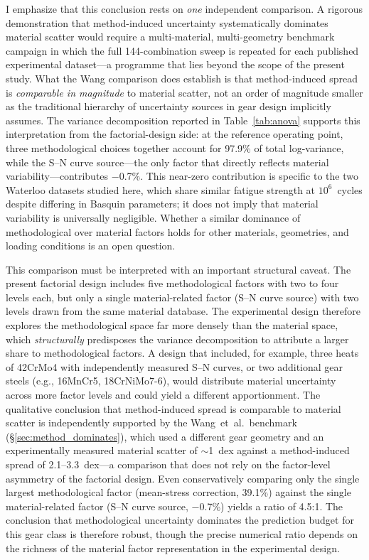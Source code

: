 \documentclass[12pt,a4paper]{article}
\begin{document}
I emphasize that this conclusion rests on \emph{one} independent
comparison. A rigorous demonstration that method-induced uncertainty
systematically dominates material scatter would require a
multi-material, multi-geometry benchmark campaign in which the full
144-combination sweep is repeated for each published experimental
dataset---a programme that lies beyond the scope of the present study.
What the Wang comparison does establish is that method-induced spread
is \emph{comparable in magnitude} to material scatter, not an order of
magnitude smaller as the traditional hierarchy of uncertainty sources
in gear design implicitly assumes. The variance decomposition reported
in Table~\ref{tab:anova} supports this
interpretation from the factorial-design side: at the reference
operating point, three methodological choices together account for
97.9\% of total log-variance, while the S--N curve source---the only
factor that directly reflects material variability---contributes
$-$0.7\%. This near-zero contribution is specific to the two Waterloo
datasets studied here, which share similar fatigue strength at
$10^6$~cycles despite differing in Basquin parameters; it does not
imply that material variability is universally negligible. Whether a
similar dominance of methodological over material factors holds for
other materials, geometries, and loading conditions is an open
question.

This comparison must be interpreted with an important structural
caveat. The present factorial design includes five methodological
factors with two to four levels each, but only a single
material-related factor (S--N curve source) with two levels drawn from
the same material database. The experimental design therefore explores
the methodological space far more densely than the material space,
which \emph{structurally} predisposes the variance decomposition to
attribute a larger share to methodological factors. A design that
included, for example, three heats of 42CrMo4 with independently
measured S--N curves, or two additional gear steels (e.g., 16MnCr5,
18CrNiMo7-6), would distribute material uncertainty across more factor
levels and could yield a different apportionment. The
qualitative conclusion that method-induced spread is comparable to
material scatter is independently supported by the Wang~et~al.\
benchmark (\S\ref{sec:method_dominates}), which used a different gear
geometry and an experimentally measured material scatter of $\sim$1~dex
against a method-induced spread of 2.1--3.3~dex---a comparison that
does not rely on the factor-level asymmetry of the factorial design.
Even conservatively comparing only the single largest methodological
factor (mean-stress correction, 39.1\%) against the single
material-related factor (S--N curve source, $-$0.7\%) yields a ratio of
4.5:1. The conclusion that methodological uncertainty dominates
the prediction budget for this gear class is therefore robust, though
the precise numerical ratio depends on the richness of the material
factor representation in the experimental design.
\end{document}

